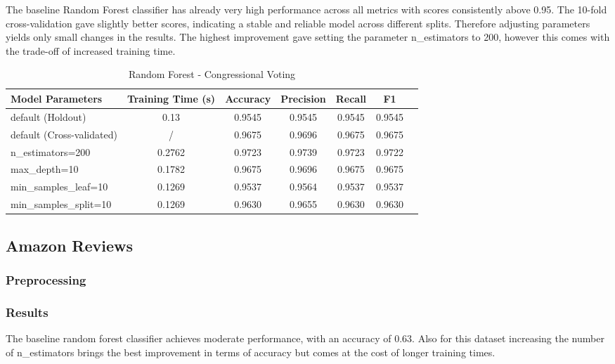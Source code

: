 \documentclass{article}
\begin{document}
The baseline Random Forest classifier has already very high performance across all metrics with scores consistently above 0.95. The 10-fold cross-validation gave slightly better scores, indicating a stable and reliable model across different splits. Therefore adjusting parameters yields only small changes in the results. The highest improvement gave setting the parameter n\_estimators to 200, however this comes with the trade-off of increased training time.

\begin{table}[ht]
\centering
\begin{tabular}{l|c|c|c|c|c|c}
\textbf{Model Parameters} & \textbf{Training Time (s)} & \textbf{Accuracy} & \textbf{Precision} & \textbf{Recall} & \textbf{F1} \\\hline
default (Holdout) & 0.13  & 0.9545 & 0.9545 & 0.9545 & 0.9545 \\
default (Cross-validated) & /  & 0.9675 & 0.9696 & 0.9675 & 0.9675 \\
n\_estimators=200 & 0.2762  & 0.9723 & 0.9739 & 0.9723 & 0.9722 \\
max\_depth=10 & 0.1782  & 0.9675 & 0.9696 & 0.9675 & 0.9675 \\
min\_samples\_leaf=10 & 0.1269  & 0.9537 & 0.9564 & 0.9537 & 0.9537 \\
min\_samples\_split=10 & 0.1269  & 0.9630 & 0.9655 & 0.9630 & 0.9630 \\
\end{tabular}
\caption{Random Forest - Congressional Voting}
\label{tab:Random Forest - Congressional Voting}
\end{table}

\subsection{Amazon Reviews}
\subsubsection{Preprocessing}
\subsubsection{Results}

The baseline random forest classifier achieves moderate performance, with an accuracy of 0.63. Also for this dataset increasing the number of n\_estimators brings the best improvement in terms of accuracy but comes at the cost of longer training times.
\end{document}
